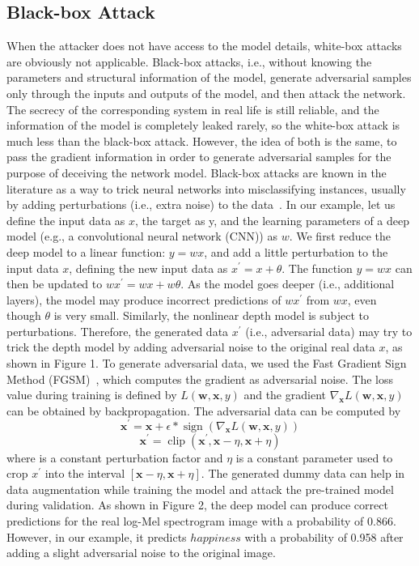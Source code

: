 \subsection{Black-box Attack}

When the attacker does not have access to the model details, white-box attacks are obviously not applicable. Black-box attacks, i.e., without knowing the parameters and structural information of the model, generate adversarial samples only through the inputs and outputs of the model, and then attack the network.
The secrecy of the corresponding system in real life is still reliable, and the information of the model is completely leaked rarely, so the white-box attack is much less than the black-box attack. However, the idea of both is the same, to pass the gradient information in order to generate adversarial samples for the purpose of deceiving the network model.
Black-box attacks are known in the literature as a way to trick neural networks into misclassifying instances, usually by adding perturbations (i.e., extra noise) to the data~\cite{ren2020generating}. In our example, let us define the input data as $x$, the target as y, and the learning parameters of a deep model (e.g., a convolutional neural network (CNN)) as $w$. We first reduce the deep model to a linear function: $y = wx$, and add a little perturbation to the input data $x$, defining the new input data as $x^{\prime}=x+\theta$. The function $y = wx$ can then be updated to $w x^{\prime}=w x+w \theta$. As the model goes deeper (i.e., additional layers), the model may produce incorrect predictions of $w x^{\prime}$ from $wx$, even though $\theta$ is very small. Similarly, the nonlinear depth model is subject to perturbations. Therefore, the generated data $x^{\prime}$ (i.e., adversarial data) may try to trick the depth model by adding adversarial noise to the original real data $x$, as shown in Figure 1.
To generate adversarial data, we used the Fast Gradient Sign Method (FGSM)~\cite{ren2020generating}, which computes the gradient as adversarial noise. The loss value during training is defined by $L(\boldsymbol{w}, \boldsymbol{x}, y)$ and the gradient $\nabla_{\boldsymbol{x}} L(\boldsymbol{w}, \boldsymbol{x}, y)$ can be obtained by backpropagation. The adversarial data can be computed by $$\boldsymbol{x}^{\prime}=\boldsymbol{x}+\epsilon * \operatorname{sign}\left(\nabla_{\boldsymbol{x}} L(\boldsymbol{w}, \boldsymbol{x}, y)\right)$$
$$\boldsymbol{x}^{\prime}=\operatorname{clip}\left(\boldsymbol{x}^{\prime}, \boldsymbol{x}-\eta, \boldsymbol{x}+\eta\right)$$where is a constant perturbation factor and $\eta$ is a constant parameter used to crop $x^{\prime}$ into the interval $[\boldsymbol{x}-\eta, \boldsymbol{x}+\eta]$. The generated dummy data can help in data augmentation while training the model and attack the pre-trained model during validation. As shown in Figure 2, the deep model can produce correct predictions for the real log-Mel spectrogram image with a probability of 0.866. However, in our example, it predicts $happiness$ with a probability of 0.958 after adding a slight adversarial noise to the original image.

